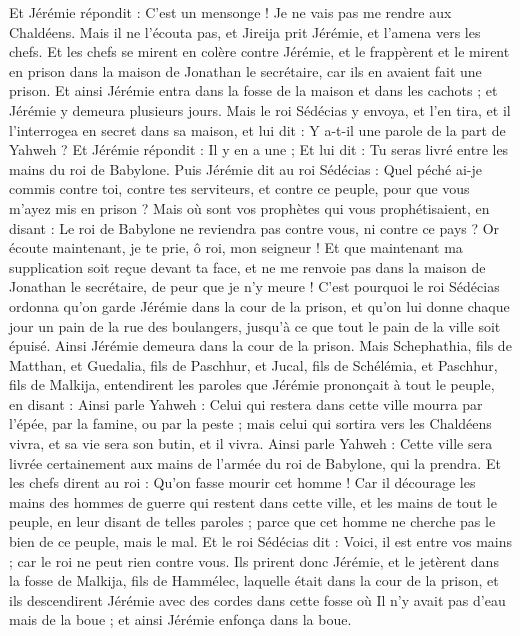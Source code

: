 \begin{multicols}{2}
Et Jérémie répondit : C'est un mensonge ! Je ne vais pas me rendre aux Chaldéens. Mais il ne l'écouta pas, et Jireija prit Jérémie, et l'amena vers les chefs.
Et les chefs se mirent en colère contre Jérémie, et le frappèrent et le mirent en prison dans la maison de Jonathan le secrétaire, car ils en avaient fait une prison.
Et ainsi Jérémie entra dans la fosse de la maison et dans les cachots ; et Jérémie y demeura plusieurs jours.
Mais le roi Sédécias y envoya, et l'en tira, et il l'interrogea en secret dans sa maison, et lui dit : Y a-t-il une parole de la part de Yahweh ? Et Jérémie répondit : Il y en a une ; Et lui dit : Tu seras livré entre les mains du roi de Babylone.
Puis Jérémie dit au roi Sédécias : Quel péché ai-je commis contre toi, contre tes serviteurs, et contre ce peuple, pour que vous m'ayez mis en prison ?
Mais où sont vos prophètes qui vous prophétisaient, en disant : Le roi de Babylone ne reviendra pas contre vous, ni contre ce pays ?
Or écoute maintenant, je te prie, ô roi, mon seigneur ! Et que maintenant ma supplication soit reçue devant ta face, et ne me renvoie pas dans la maison de Jonathan le secrétaire, de peur que je n'y meure !
C'est pourquoi le roi Sédécias ordonna qu'on garde Jérémie dans la cour de la prison, et qu'on lui donne chaque jour un pain de la rue des boulangers, jusqu'à ce que tout le pain de la ville soit épuisé. Ainsi Jérémie demeura dans la cour de la prison.
\VerseOne{}Mais Schephathia, fils de Matthan, et Guedalia, fils de Paschhur, et Jucal, fils de Schélémia, et Paschhur, fils de Malkija, entendirent les paroles que Jérémie prononçait à tout le peuple, en disant :
Ainsi parle Yahweh : Celui qui restera dans cette ville mourra par l'épée, par la famine, ou par la peste ; mais celui qui sortira vers les Chaldéens vivra, et sa vie sera son butin, et il vivra.
Ainsi parle Yahweh : Cette ville sera livrée certainement aux mains de l'armée du roi de Babylone, qui la prendra.
Et les chefs dirent au roi : Qu'on fasse mourir cet homme ! Car il décourage les mains des hommes de guerre qui restent dans cette ville, et les mains de tout le peuple, en leur disant de telles paroles ; parce que cet homme ne cherche pas le bien de ce peuple, mais le mal.
Et le roi Sédécias dit : Voici, il est entre vos mains ; car le roi ne peut rien contre vous.
Ils prirent donc Jérémie, et le jetèrent dans la fosse de Malkija, fils de Hammélec, laquelle était dans la cour de la prison, et ils descendirent Jérémie avec des cordes dans cette fosse où Il n'y avait pas d'eau mais de la boue ; et ainsi Jérémie enfonça dans la boue.

\end{multicols}
